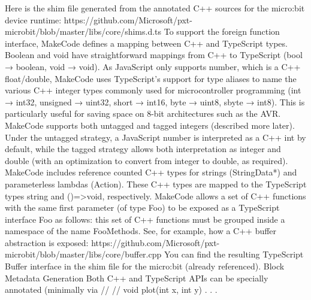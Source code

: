 {Here is the shim file generated from the annotated C++ sources for the micro:bit device runtime: 
https://github.com/Microsoft/pxt-microbit/blob/master/libs/core/shims.d.ts
To support the foreign function interface, MakeCode defines a mapping between C++ and TypeScript types.  Boolean and void have straightforward mappings from C++ to TypeScript (bool → boolean, void → void). As JavaScript only supports number, which is a C++ float/double, MakeCode uses TypeScript’s support for type aliases to name the various C++ integer types commonly used for microcontroller programming (int → int32, unsigned → uint32, short → int16, byte → uint8, sbyte → int8).  This is particularly useful for saving space on 8-bit architectures such as the AVR. 
MakeCode supports both untagged and tagged integers (described more later).  Under the untagged strategy, a JavaScript number is interpreted as a C++ int by default, while the tagged strategy allows both interpretation as integer and double (with an optimization to convert from integer to double, as required).  MakeCode includes reference counted C++ types for strings (StringData*) and parameterless lambdas (Action). These C++ types are mapped to the TypeScript types string and ()=>void, respectively. 
MakeCode allows a set of C++ functions with the same first parameter (of type Foo) to be exposed as a TypeScript interface Foo as follows: this set of C++ functions must be grouped inside a namespace of the name FooMethods.  See, for example, how a C++ buffer abstraction is exposed:
	https://github.com/Microsoft/pxt-microbit/blob/master/libs/core/buffer.cpp
You can find the resulting TypeScript Buffer interface in the shim file for the micro:bit (already referenced).
Block Metadata Generation
Both C++ and TypeScript APIs can be specially annotated (minimally via //%
//%
void plot(int x, int y) { . . . }

}
